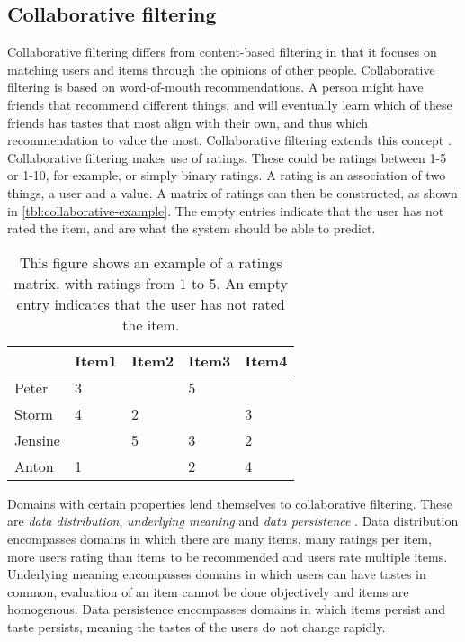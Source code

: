 \subsection{Collaborative filtering}
Collaborative filtering differs from content-based filtering in that it focuses on matching users and items through the opinions of other people.
Collaborative filtering is based on word-of-mouth recommendations.
A person might have friends that recommend different things, and will eventually learn which of these friends has tastes that most align with their own, and thus which recommendation to value the most.
Collaborative filtering extends this concept \cite{CollaborativeFiltering}.
Collaborative filtering makes use of ratings.
These could be ratings between 1-5 or 1-10, for example, or simply binary ratings.
A rating is an association of two things, a user and a value.
A matrix of ratings can then be constructed, as shown in \autoref{tbl:collaborative-example}.
The empty entries indicate that the user has not rated the item, and are what the system should be able to predict.
\begin{table}[H]
    \centering
    \begin{tabular}{|l|l|l|l|l|}
    \hline
           & Item1 & Item2 & Item3 & Item4 \\ \hline
    Peter  & 3     &       & 5     &       \\ \hline
    Storm    & 4     & 2     &       & 3     \\ \hline
    Jensine   &       & 5     & 3     & 2     \\ \hline
    Anton & 1     &       & 2     & 4     \\ \hline
    \end{tabular}
    \caption{This figure shows an example of a ratings matrix, with ratings from 1 to 5. An empty entry indicates that the user has not rated the item.}
    \label{tbl:collaborative-example}
\end{table}
\noindent
Domains with certain properties lend themselves to collaborative filtering. 
These are \textit{data distribution}, \textit{underlying meaning} and \textit{data persistence} \cite{CollaborativeFiltering}.
Data distribution encompasses domains in which there are many items, many ratings per item, more users rating than items to be recommended and users rate multiple items.
Underlying meaning encompasses domains in which users can have tastes in common, evaluation of an item cannot be done objectively and items are homogenous.
Data persistence encompasses domains in which items persist and taste persists, meaning the tastes of the users do not change rapidly.
